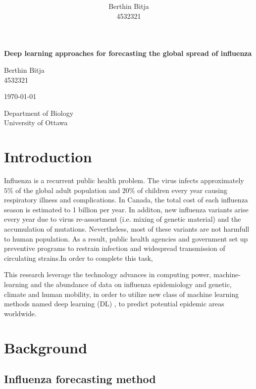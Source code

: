 \documentclass[12pt]{article}
\title{ }
\author{Berthin Bitja \\ 4532321}
\date{}
\begin{document}
\begin{titlepage}
	\centering

	{\Large\bfseries Deep learning approaches for forecasting the global spread of influenza \par}
	\vspace{2cm}
	{\small Berthin Bitja \\ 4532321 \par}
	{\small \today\par}
	\vfill
	
	{\large Department of Biology \\ University of Ottawa \par}


\end{titlepage}

\newpage

\tableofcontents

\newpage

\section{Introduction}
Influenza is a recurrent public health problem. The virus infects approximately $5\%$ of the global adult population and $20\%$ of children every year causing respiratory illness and complications\autocite{Ting2017}. In Canada, the total cost of each influenza season is estimated to 1 billion per year\autocite{Molinari2007}. In additon, new influenza variants arise every year due to virus re-assortment (i.e. mixing of genetic material) and the accumulation of mutations. Nevertheless, most of these variants are not harmfull to human population. As a result, public health agencies and government set up preventive programs  to restrain infection and widespread transmission of circulating strains\autocite{Jefferson2005}.In order to complete this task, 

This research leverage the technology advances in computing power, machine-learning and the abundance of data on influenza epidemiology and genetic, climate and human mobility, in order to utilize new class of machine learning methods named deep learning (DL) , to predict potential epidemic areas worldwide.

\section{Background}

\subsection{Influenza forecasting method}
\end{document}

